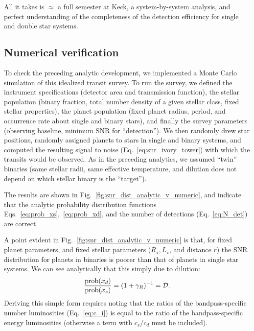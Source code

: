 \documentclass{emulateapj}
\begin{document}
All it takes is $\approx$ a full semester at Keck, a system-by-system analysis, 
and perfect understanding of the completeness of the detection efficiency for 
single and double star systems.


\subsection{Numerical verification}

To check the preceding analytic development, we implemented a Monte Carlo 
simulation of this idealized transit survey.
To run the survey, we defined the instrument specifications (detector area and 
transmission function), the stellar population (binary fraction, total number 
density of a given stellar class, fixed stellar 
properties), the planet population (fixed planet radius, period, and occurrence 
rate about single and binary stars), and finally the survey parameters 
(observing baseline, minimum SNR for ``detection'').
We then randomly drew star positions, randomly assigned planets to stars in 
single and binary systems, and computed the resulting signal to noise 
(Eq.~\ref{eq:snr_ivory_tower}) with which 
the transits would be observed.
As in the preceding analytics, we assumed ``twin'' binaries (same stellar 
radii, same effective 
temperature, and dilution does not depend on which stellar binary is the 
``target'').

The results are shown in Fig.~\ref{fig:snr_dist_analytic_v_numeric}, and 
indicate that the analytic probability distribution functions 
Eqs.~\ref{eq:prob_xs},~\ref{eq:prob_xd}, and the number of 
detections (Eq.~\ref{eq:N_det}) are correct.

A point evident in Fig.~\ref{fig:snr_dist_analytic_v_numeric} is that, for 
fixed planet parameters, and fixed stellar parameters ($R_\star, L_\star$, and 
distance $r$) the SNR distribution for planets in binaries is poorer than that 
of planets in single star systems.
We can see analytically that this simply due to dilution:
\begin{equation}
\frac{{\rm prob}(x_d)}{{\rm prob}(x_s)} =(1 + \gamma_R)^{-1} = \mathcal{D}.
\end{equation}
Deriving this simple form requires noting that the ratios of the 
bandpass-specific number luminosities (Eq.~\ref{eq:c_i}) is equal to the ratio 
of the bandpass-specific energy luminosities (otherwise a term with $c_s/c_d$ 
must be included).
\end{document}
